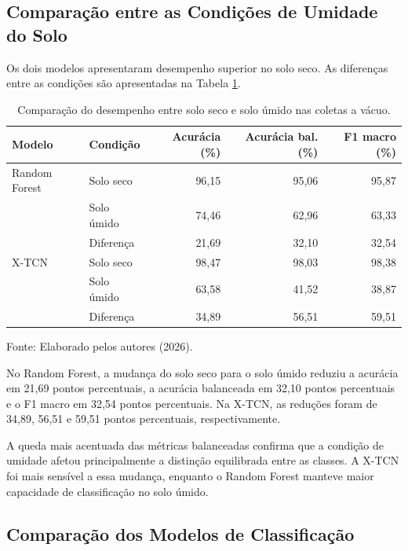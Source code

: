 \subsection{Comparação entre as Condições de Umidade do Solo}

Os dois modelos apresentaram desempenho superior no solo seco. As diferenças
entre as condições são apresentadas na Tabela
\ref{tab:comparacao_umidade_vacuo}.

\begin{table}[htbp]
    \centering
    \caption{Comparação do desempenho entre solo seco e solo úmido nas coletas a vácuo.}
    \label{tab:comparacao_umidade_vacuo}
    \footnotesize
    \begin{tabular}{llrrr}
        \hline
        \textbf{Modelo} & \textbf{Condição} & \textbf{Acurácia (\%)} &
        \textbf{Acurácia bal. (\%)} & \textbf{F1 macro (\%)} \\
        \hline
        Random Forest & Solo seco  & 96,15 & 95,06 & 95,87 \\
                      & Solo úmido & 74,46 & 62,96 & 63,33 \\
                      & Diferença  & 21,69 & 32,10 & 32,54 \\
        \hline
        X-TCN         & Solo seco  & 98,47 & 98,03 & 98,38 \\
                      & Solo úmido & 63,58 & 41,52 & 38,87 \\
                      & Diferença  & 34,89 & 56,51 & 59,51 \\
        \hline
    \end{tabular}

    \vspace{0.1cm}
    {\footnotesize Fonte: Elaborado pelos autores (2026).}
\end{table}

No Random Forest, a mudança do solo seco para o solo úmido reduziu a acurácia
em 21,69 pontos percentuais, a acurácia balanceada em 32,10 pontos percentuais
e o F1 macro em 32,54 pontos percentuais. Na X-TCN, as reduções foram de 34,89,
56,51 e 59,51 pontos percentuais, respectivamente.

A queda mais acentuada das métricas balanceadas confirma que a condição de
umidade afetou principalmente a distinção equilibrada entre as classes. A
X-TCN foi mais sensível a essa mudança, enquanto o Random Forest manteve maior
capacidade de classificação no solo úmido.

\subsection{Comparação dos Modelos de Classificação}

